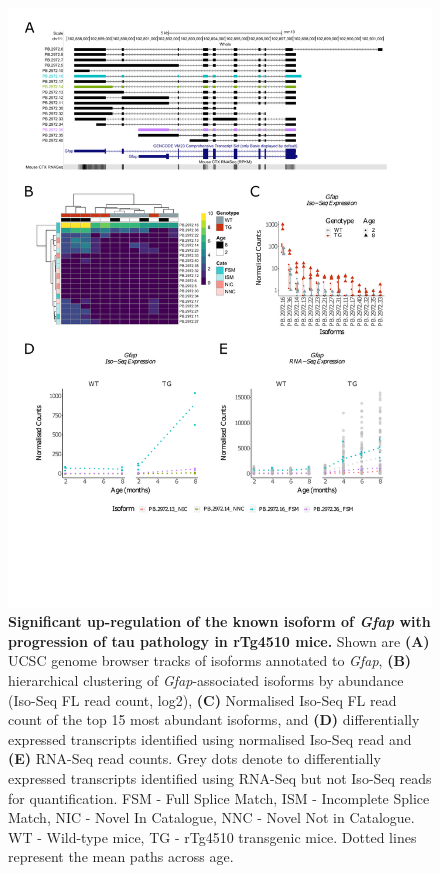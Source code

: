 \begin{figure}[!htp]
	\centering
	\includegraphics[page=1,trim={0.5cm 4.8cm 2cm 1cm}, scale = 0.85]{Figures/Ch5_DiffPlots.pdf}
	\captionsetup{width=0.95\textwidth}
	\caption[Differential \textit{Gfap} transcript expression in rTg4510 mice]%
	{\textbf{Significant up-regulation of the known isoform of \textit{Gfap} with progression of tau pathology in rTg4510 mice.} Shown are \textbf{(A)} UCSC genome browser tracks of isoforms annotated to \textit{Gfap}, \textbf{(B)} hierarchical clustering of \textit{Gfap}-associated isoforms by abundance (Iso-Seq FL read count, log2), \textbf{(C)} Normalised Iso-Seq FL read count of the top 15 most abundant isoforms, and \textbf{(D)} differentially expressed transcripts identified using normalised Iso-Seq read and \textbf{(E)} RNA-Seq read counts. Grey dots denote to differentially expressed transcripts identified using RNA-Seq but not Iso-Seq reads for quantification. FSM - Full Splice Match, ISM - Incomplete Splice Match, NIC - Novel In Catalogue, NNC - Novel Not in Catalogue. WT - Wild-type mice, TG - rTg4510 transgenic mice. Dotted lines represent the mean paths across age.} 
	\label{fig:DEI_gfap}
\end{figure}

